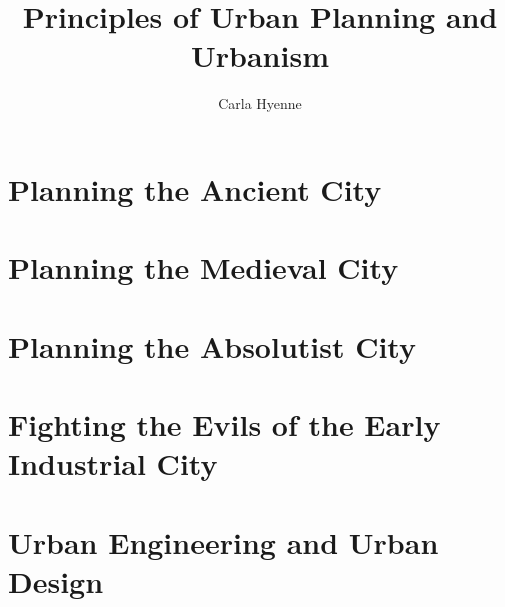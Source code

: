 \documentclass{article}
\title{Principles of Urban Planning and Urbanism}
\author{Carla Hyenne}
\begin{document}
\maketitle

\tableofcontents

\pagebreak

\section{Planning the Ancient City}

\section{Planning the Medieval City}

\section{Planning the Absolutist City}

\section{Fighting the Evils of the Early Industrial City}

\section{Urban Engineering and Urban Design}
\end{document}
